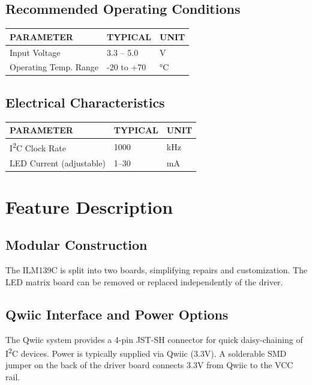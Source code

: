 \documentclass[10pt]{article}
\newcommand{\sectionbreak}{\clearpage}
\begin{document}
	\subsection{Recommended Operating Conditions}\label{sec:specs.2}
	\begin{tabularx}{\textwidth}{|X|X|X|}
		\hline
		\rowcolor{gray!25}\textbf{PARAMETER} & \textbf{TYPICAL} & \textbf{UNIT} \\ \hline
		Input Voltage & 3.3 – 5.0 & V \\ \hline
		Operating Temp. Range & -20 to +70 & °C \\ \hline
	\end{tabularx}
	\label{tab:opcond}
	
	\subsection{Electrical Characteristics}\label{sec:specs.3}
	\begin{tabularx}{\textwidth}{|X|X|X|}
		\hline
		\rowcolor{gray!25}\textbf{PARAMETER} & \textbf{TYPICAL} & \textbf{UNIT} \\ \hline
		I\textsuperscript{2}C Clock Rate & 1000 & kHz \\ \hline
		LED Current (adjustable) & 1–30 & mA \\ \hline
	\end{tabularx}
	\label{tab:elec}
	
	\sectionbreak
	
	\section{Feature Description}\label{sec:features_desc}
	\subsection{Modular Construction}
	The ILM139C is split into two boards, simplifying repairs and customization. The LED matrix board can be removed or replaced independently of the driver.
	
	\subsection{Qwiic Interface and Power Options}
	The Qwiic system provides a 4-pin JST-SH connector for quick daisy-chaining of I\textsuperscript{2}C devices. Power is typically supplied via Qwiic (3.3V). A solderable SMD jumper on the back of the driver board connects 3.3V from Qwiic to the VCC rail.
	
\end{document}
